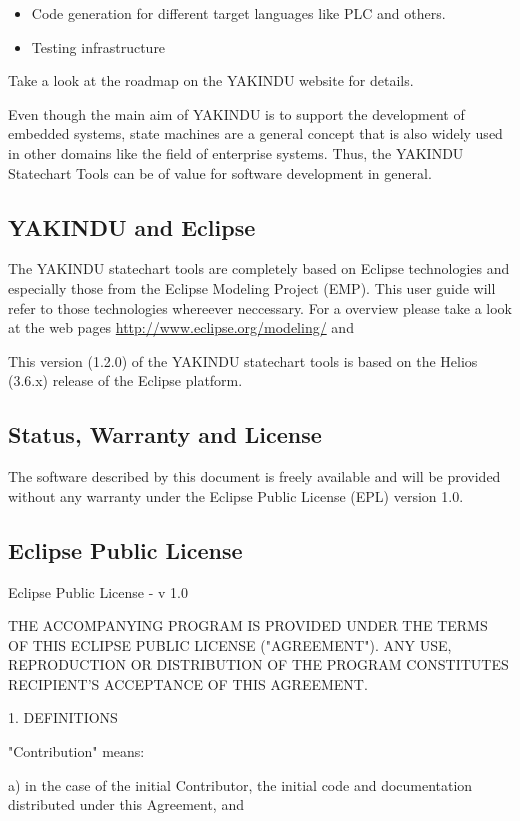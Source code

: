 \begin{itemize}
\item Code generation for different target languages like PLC and others. 
\item Testing infrastructure
\end{itemize}

Take a look at the roadmap on the YAKINDU website for details.

Even though the main aim of YAKINDU is to support the development of embedded
systems, state machines are a general concept that is also widely used in
other domains like the field of enterprise systems. Thus, the YAKINDU
Statechart Tools can be of value for software development in general.


\subsection{YAKINDU and Eclipse}

The YAKINDU statechart tools are completely based on Eclipse technologies and
especially those from the Eclipse Modeling Project (EMP). This user guide will refer to those technologies
whereever neccessary. For a overview please take a look at the web pages
\url{http://www.eclipse.org/modeling/} and

This version (1.2.0) of the YAKINDU statechart tools is based on the Helios (3.6.x) release of the Eclipse platform.
  
  
\subsection{Status, Warranty and License}
The software described by this document is freely available and will be provided without
any warranty under the Eclipse Public License (EPL) version 1.0. 


\subsection{Eclipse Public License}

Eclipse Public License - v 1.0

THE ACCOMPANYING PROGRAM IS PROVIDED UNDER THE TERMS OF THIS
ECLIPSE PUBLIC LICENSE ("AGREEMENT"). ANY USE, REPRODUCTION OR
DISTRIBUTION OF THE PROGRAM CONSTITUTES RECIPIENT'S ACCEPTANCE
OF THIS AGREEMENT.


1. DEFINITIONS

"Contribution" means:

a) in the case of the initial Contributor, the initial code and
documentation distributed under this Agreement, and

